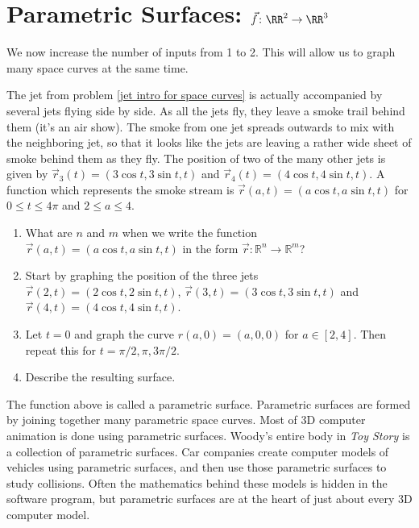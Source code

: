 \section{Parametric Surfaces: $\vec f\colon  \RR^2 \to \RR^3$}
We now increase the number of inputs from 1 to 2.  This will allow us to graph many space curves at the same time.

\begin{problem} \label{parametric surface example}%
%
 The jet from problem \ref{jet intro for space curves} is actually accompanied by several jets flying side by side. As all the jets fly, they leave a smoke trail behind them (it's an air show). The smoke from one jet spreads outwards to mix with the neighboring jet, so that it looks like the jets are leaving a rather wide sheet of smoke behind them as they fly. The position of two of the many other jets is given by $\vec r_3(t)=(3\cos t, 3\sin t, t)$ and $\vec r_4(t)=(4\cos t,4\sin t,t)$.  A function which represents the smoke stream is $\vec r(a,t)=(a\cos t, a\sin t, t)$ for $0\leq t\leq 4\pi$ and $2\leq a\leq 4$.
 \begin{enumerate}
  \item What are $n$ and $m$ when we write the function $\vec r(a,t)=(a\cos t, a\sin t, t)$ in the form  $\vec r\colon {\mathbb{R}}^n\to {\mathbb{R}}^m$?
  \item Start by graphing the position of the three jets $\vec r(2,t)=(2\cos t, 2\sin t, t)$, $\vec r(3,t)=(3\cos t, 3\sin t, t)$ and $\vec r(4,t)=(4\cos t,4\sin t,t)$.  
  \item Let $t=0$ and graph the curve $r(a,0)=(a,0,0)$ for $a\in[2,4]$.  Then repeat this for $t=\pi/2,\pi,3\pi/2$.
  \item Describe the resulting surface.
 \end{enumerate}
\end{problem}

The function above is called a parametric surface.  Parametric surfaces are formed by joining together many parametric space curves. Most of 3D computer animation is done using parametric surfaces. Woody's entire body in {\it Toy Story} is a collection of parametric surfaces. Car companies create computer models of vehicles using parametric surfaces, and then use those parametric surfaces to study collisions. Often the mathematics behind these models is hidden in the software program, but parametric surfaces are at the heart of just about every 3D computer model.

